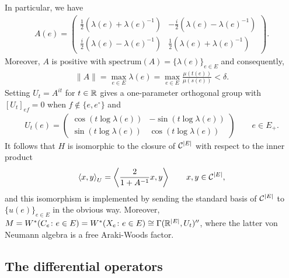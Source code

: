 In particular, we have
\begin{align*}
A(e)=
\left(
\begin{array}{cc}
\frac{1}{2}\left(\lambda(e)+\lambda(e)^{-1}\right)	&	-\frac{i}{2}\left(\lambda(e)-\lambda(e)^{-1}\right) \\
\frac{i}{2}\left(\lambda(e)-\lambda(e)^{-1}\right)	&	\frac{1}{2}\left(\lambda(e)+\lambda(e)^{-1}\right)
\end{array}
\right).
\end{align*}
Moreover, $A$ is positive with $\text{spectrum}(A)=\{\lambda(e)\}_{e\in E}$ and consequently,
\begin{align}\label{norm_of_A}
\|A\| = \max_{e\in E} \lambda(e) =\max_{e\in E} \frac{\mu(t(e))}{\mu(s(e))}<\delta.
\end{align}
Setting $U_t=A^{it}$ for $t\in \mathbb{R}$ gives a one-parameter orthogonal group with $[U_t]_{ef}=0$ when $f\not\in \{e,e^\circ\}$ and
\begin{align*}
U_t(e)=
\left(
\begin{array}{ll}
\cos(t\log{\lambda(e)})	&	-\sin(t\log{\lambda(e)})\\
\sin(t\log{\lambda(e)})	&	\cos(t\log{\lambda(e)})
\end{array}
\right)\qquad e\in E_+.
\end{align*}
It follows that $H$ is isomorphic to the closure of $\mathcal C^{|E|}$ with respect to the inner product
\begin{align*}
\left\langle x,y\right\rangle_U=\left\langle\frac{2}{1+A^{-1}}x,y\right\rangle\qquad x,y\in \mathcal C^{|E|},
\end{align*}
and this isomorphism is implemented by sending the standard basis of $\mathcal C^{|E|}$ to $\{u(e)\}_{e\in E}$ in the obvious way. Moreover, $M=W^*(C_e\colon e\in E)=W^*(X_e\colon e\in E)\cong \Gamma(\mathbb{R}^{|E|}, U_t)''$, where the latter von Neumann algebra is a free Araki-Woods factor.




\subsection{The differential operators}

